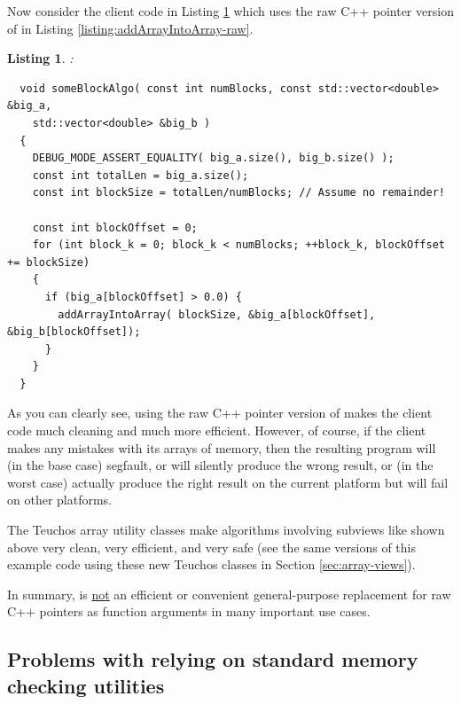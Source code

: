 \documentclass[pdf,ps2pdf,11pt]{SANDreport}
\newtheorem{listing}{Listing}
\begin{document}
Now consider the client code in Listing
{}\ref{listing:someBlockAlgo-std-vector-raw-ptr} which uses the raw C++
pointer version of {} in Listing
{}\ref{listing:addArrayIntoArray-raw}.

\begin{listing}:\\
\label{listing:someBlockAlgo-std-vector-raw-ptr}
{\small\begin{verbatim}
  void someBlockAlgo( const int numBlocks, const std::vector<double> &big_a,
    std::vector<double> &big_b )
  {
    DEBUG_MODE_ASSERT_EQUALITY( big_a.size(), big_b.size() );
    const int totalLen = big_a.size();
    const int blockSize = totalLen/numBlocks; // Assume no remainder!
    
    const int blockOffset = 0;
    for (int block_k = 0; block_k < numBlocks; ++block_k, blockOffset += blockSize)
    {
      if (big_a[blockOffset] > 0.0) {
        addArrayIntoArray( blockSize, &big_a[blockOffset], &big_b[blockOffset]);
      }
    }
  }
\end{verbatim}}
\end{listing}

As you can clearly see, using the raw C++ pointer version of
{} makes the client code much cleaning
and much more efficient.  However, of course, if the client makes any
mistakes with its arrays of memory, then the resulting program will
(in the base case) segfault, or will silently produce the wrong
result, or (in the worst case) actually produce the right result on
the current platform but will fail on other platforms.

The Teuchos array utility classes make algorithms involving subviews
like shown above very clean, very efficient, and very safe (see the
same versions of this example code using these new Teuchos classes in
Section {}\ref{sec:array-views}).

In summary, {} is {}\underline{not} an efficient
or convenient general-purpose replacement for raw C++ pointers as
function arguments in many important use cases.


%
{}\subsection{Problems with relying on standard memory checking
utilities}
\label{sec:problems-with-mem-checkers}
%
\end{document}
